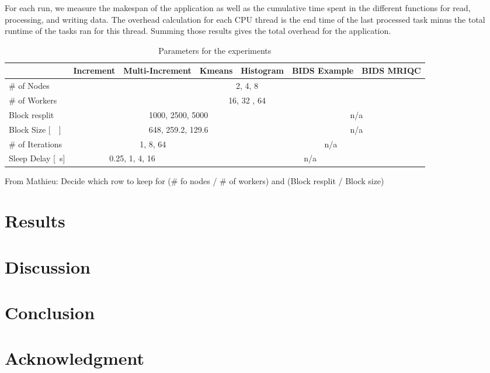 \documentclass[conference]{IEEEtran}
\newcommand{\MD}[1]{\color{magenta}From Mathieu: #1 \color{black}}
\begin{document}
For each run, we measure the makespan of the application as well as the cumulative time spent in the different functions for read, processing, and writing data.
The overhead calculation for each CPU thread is the end time of the last processed task minus the total runtime of the tasks ran for this thread.
Summing those results gives the total overhead for the application.

\begin{table}[t]
	\renewcommand{\arraystretch}{1.5}
	\caption{Parameters for the experiments}\label{table:parameters}
	\centering
	\begin{tabular}{|l|c|c|c|c|c|c|}
		\hline & Increment & Multi-Increment & Kmeans & Histogram & BIDS Example & BIDS MRIQC \\\hline
		\# of Nodes & \multicolumn{6}{c|}{2, 4, 8} \\\hline
		\# of Workers & \multicolumn{6}{c|}{16, 32 , 64} \\ \hline
		Block resplit & \multicolumn{4}{c|}{1000, 2500, 5000}  & \multicolumn{2}{c|}{n/a} \\\hline
		Block Size {[}\SI{}{\mega\byte}{]} & \multicolumn{4}{c|}{648, 259.2, 129.6} & \multicolumn{2}{c|}{n/a} \\\hline
		\# of Iterations & \multicolumn{3}{c|}{1, 8, 64}                 & \multicolumn{3}{c|}{n/a} \\\hline
		Sleep Delay {[}\SI{}{\second}{]} & \multicolumn{2}{c|}{0.25, 1, 4, 16} & \multicolumn{4}{c|}{n/a} \\\hline
	\end{tabular}
\end{table}
\MD{Decide which row to keep for (\# fo nodes / \# of workers) and (Block resplit / Block size)}

\section{Results} %
\section{Discussion} %
\section{Conclusion} %
\section*{Acknowledgment} %



\end{document}
